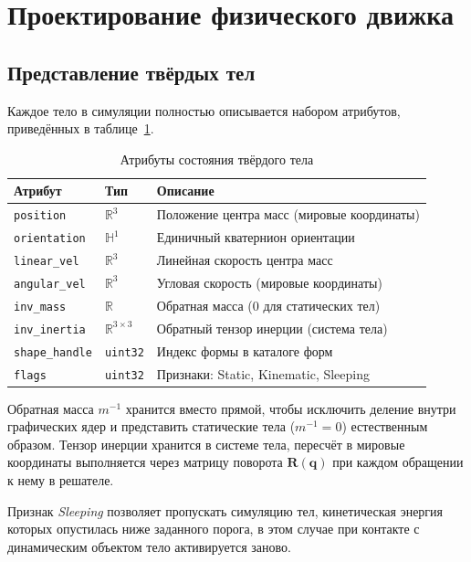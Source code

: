 \section{Проектирование физического движка}

\subsection{Представление твёрдых тел}
\label{sec:rigid_body}

Каждое тело в симуляции полностью описывается набором атрибутов, приведённых в 
таблице~\ref{tab:rigidbody_state}.

\begin{table}[h]
\centering
\caption{Атрибуты состояния твёрдого тела}
\label{tab:rigidbody_state}
\begin{tabular}{llp{5.5cm}}
\toprule
\textbf{Атрибут} & \textbf{Тип} & \textbf{Описание} \\
\midrule
\texttt{position}      & $\mathbb{R}^3$          & Положение центра масс (мировые координаты) \\
\texttt{orientation}   & $\mathbb{H}^1$          & Единичный кватернион ориентации \\
\texttt{linear\_vel}   & $\mathbb{R}^3$          & Линейная скорость центра масс \\
\texttt{angular\_vel}  & $\mathbb{R}^3$          & Угловая скорость (мировые координаты) \\
\texttt{inv\_mass}     & $\mathbb{R}$            & Обратная масса ($0$ для статических тел) \\
\texttt{inv\_inertia}  & $\mathbb{R}^{3\times3}$ & Обратный тензор инерции (система тела) \\
\texttt{shape\_handle} & \texttt{uint32}         & Индекс формы в каталоге форм \\
\texttt{flags}         & \texttt{uint32}         & Признаки: Static, Kinematic, Sleeping \\
\bottomrule
\end{tabular}
\end{table}

Обратная масса $m^{-1}$ хранится вместо прямой, чтобы исключить деление внутри графических ядер и представить 
статические тела ($m^{-1} = 0$) естественным образом. Тензор инерции хранится в системе тела, пересчёт в 
мировые координаты выполняется через матрицу поворота $\mathbf{R}(\mathbf{q})$ при каждом обращении к нему в 
решателе.

Признак \textit{Sleeping} позволяет пропускать симуляцию тел, кинетическая энергия которых опустилась ниже 
заданного порога, в этом случае при контакте с динамическим объектом тело активируется заново.

